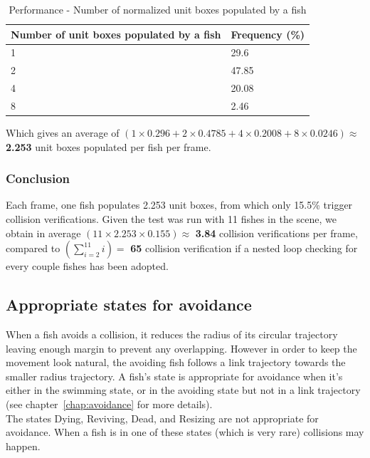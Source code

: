 \begin{table}[H]
\centering
\begin{tabular} { | l | l | }
\hline
\textbf{Number of unit boxes populated by a fish} & \textbf{Frequency (\%)} \\
\hline
1 & 29.6 \\
\hline
2 & 47.85 \\
\hline
4 & 20.08 \\
\hline
8 & 2.46 \\
\hline
\end{tabular}
\caption{Performance - Number of normalized unit boxes populated by a fish}
\label{tab:numberunitboxfish}
\end{table}

Which gives an average of $(1 \times 0.296 + 2 \times 0.4785 + 4 \times 0.2008 + 8 \times 0.0246) \approx$ \textbf{2.253} unit boxes populated per fish per frame.

\subsubsection{Conclusion}

Each frame, one fish populates 2.253 unit boxes, from which only 15.5\% trigger collision verifications. Given the test was run with 11 fishes in the scene, we obtain in average $(11 \times 2.253 \times 0.155) \approx $ \textbf{3.84} collision verifications per frame, compared to $(\sum\limits_{i=2}^{11} i) =$ \textbf{65} collision verification if a nested loop checking for every couple fishes has been adopted.

\subsection{Appropriate states for avoidance}
When a fish avoids a collision, it reduces the radius of its circular trajectory leaving enough margin to prevent any overlapping. However in order to keep the movement look natural, the avoiding fish follows a link trajectory towards the smaller radius trajectory. A fish's state is appropriate for avoidance when it's either in the swimming state, or in the avoiding state but not in a link trajectory (see chapter~\ref{chap:avoidance} for more details).\\

The states Dying, Reviving, Dead, and Resizing are not appropriate for avoidance. When a fish is in one of these states (which is very rare) collisions may happen.\\

